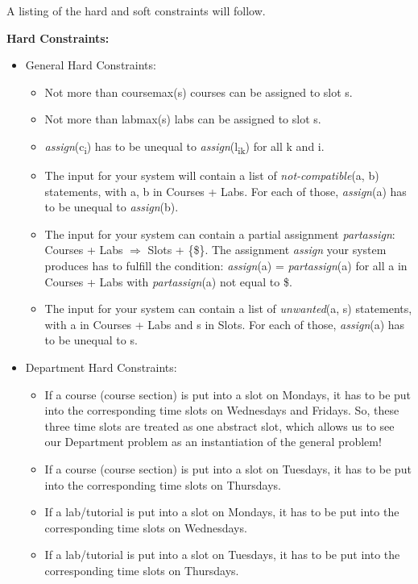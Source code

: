 \documentclass[11pt, oneside]{article}   	%
\begin{document}
\noindent A listing of the hard and soft constraints will follow.

\noindent \textbf{Hard Constraints:}
\begin{itemize}[topsep=0pt, itemsep=0pt]
\item General Hard Constraints:
    \begin{itemize}[topsep=0pt, itemsep=0pt]
    \item Not more than coursemax(s) courses can be assigned to slot s.
    \item Not more than labmax(s) labs can be assigned to slot s.
    \item \textit{assign}(c\textsubscript{i}) has to be unequal to \textit{assign}(l\textsubscript{ik}) for all k and i.
    \item The input for your system will contain a list of \textit{not-compatible}(a, b) statements, with a, b in Courses + Labs. For each of those, \textit{assign}(a) has to be unequal to \textit{assign}(b).
    \item The input for your system can contain a partial assignment \textit{partassign}: Courses + Labs $\Rightarrow$ Slots + \{\$\}. The assignment \textit{assign} your system produces has to fulfill the condition: 
    \textit{assign}(a) = \textit{partassign}(a) for all a in Courses + Labs with \textit{partassign}(a) not equal to \$.
    \item The input for your system can contain a list of \textit{unwanted}(a, s) statements, with a in Courses + Labs and s in Slots. For each of those, \textit{assign}(a) has to be unequal to s.
    \end{itemize}
\item Department Hard Constraints:
    \begin{itemize}[topsep=0pt, itemsep=0pt]
    \item If a course (course section) is put into a slot on Mondays, it has to be put into the corresponding time slots on Wednesdays and Fridays. So, these three time slots are treated as one abstract slot, which allows us to see our Department problem as an instantiation of the general problem!
    \item If a course (course section) is put into a slot on Tuesdays, it has to be put into the corresponding time slots on Thursdays.
    \item If a lab/tutorial is put into a slot on Mondays, it has to be put into the corresponding time slots on Wednesdays.
    \item If a lab/tutorial is put into a slot on Tuesdays, it has to be put into the corresponding time slots on Thursdays.

\end{itemize}
\end{itemize}
\end{document}
